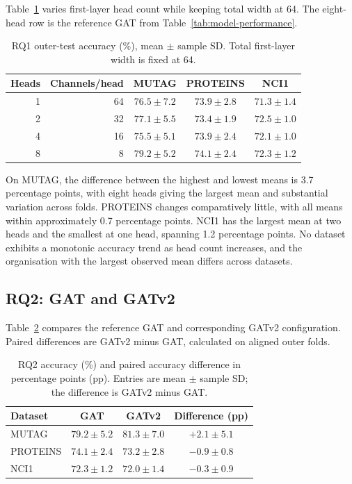 \documentclass[11pt,a4paper]{article}
\begin{document}
Table~\ref{tab:rq1-results} varies first-layer head count while keeping total width at 64. The eight-head row is the reference GAT from Table~\ref{tab:model-performance}.

\begin{table}[!ht]
\centering
\caption{RQ1 outer-test accuracy (\%), mean \(\pm\) sample SD. Total first-layer width is fixed at 64.}
\label{tab:rq1-results}
\begin{tabular}{@{}rrccc@{}}
\toprule
Heads & Channels/head & MUTAG & PROTEINS & NCI1\\
\midrule
1 & 64 & \(76.5\pm7.2\) & \(73.9\pm2.8\) & \(71.3\pm1.4\)\\
2 & 32 & \(77.1\pm5.5\) & \(73.4\pm1.9\) & \(72.5\pm1.0\)\\
4 & 16 & \(75.5\pm5.1\) & \(73.9\pm2.4\) & \(72.1\pm1.0\)\\
8 & 8 & \(79.2\pm5.2\) & \(74.1\pm2.4\) & \(72.3\pm1.2\)\\
\bottomrule
\end{tabular}
\end{table}

On MUTAG, the difference between the highest and lowest means is 3.7 percentage points, with eight heads giving the largest mean and substantial variation across folds. PROTEINS changes comparatively little, with all means within approximately 0.7 percentage points. NCI1 has the largest mean at two heads and the smallest at one head, spanning 1.2 percentage points. No dataset exhibits a monotonic accuracy trend as head count increases, and the organisation with the largest observed mean differs across datasets.

\subsection{RQ2: GAT and GATv2}
\label{sec:results-rq2}

Table~\ref{tab:rq2-results} compares the reference GAT and corresponding GATv2 configuration. Paired differences are GATv2 minus GAT, calculated on aligned outer folds.

\begin{table}[!ht]
\centering
\caption{RQ2 accuracy (\%) and paired accuracy difference in percentage points (pp). Entries are mean \(\pm\) sample SD; the difference is GATv2 minus GAT.}
\label{tab:rq2-results}
\begin{tabular}{@{}lccc@{}}
\toprule
Dataset & GAT & GATv2 & Difference (pp)\\
\midrule
MUTAG & \(79.2\pm5.2\) & \(81.3\pm7.0\) & \(+2.1\pm5.1\)\\
PROTEINS & \(74.1\pm2.4\) & \(73.2\pm2.8\) & \(-0.9\pm0.8\)\\
NCI1 & \(72.3\pm1.2\) & \(72.0\pm1.4\) & \(-0.3\pm0.9\)\\
\bottomrule
\end{tabular}
\end{table}
\end{document}
